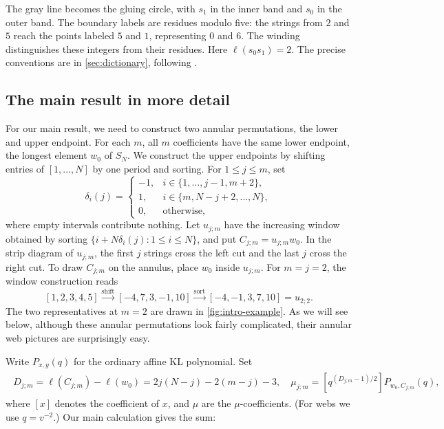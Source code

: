 \documentclass[a4paper,11pt]{amsart}
\numberwithin{equation}{subsection}
\theoremstyle{plain}
\theoremstyle{definition}
\theoremstyle{remark}
\begin{document}
The gray line becomes the gluing circle, with $s_1$ in the inner
band and $s_0$ in the outer band. The boundary labels are residues
modulo five: the strings from $2$ and $5$ reach the points labeled
$5$ and $1$, representing $0$ and $6$.
The winding distinguishes these integers from their residues.
Here $\ell(s_0s_1)=2$.
The precise conventions are in \autoref{sec:dictionary}, following
\cite[Section~2A]{HT}.

\subsection{The main result in more detail}

For our main result, we need to construct two annular permutations, the lower and upper endpoint.
For each $m$, all $m$ coefficients have the same lower endpoint, the longest element $w_0$ of $S_{N}$.
We construct the upper endpoints by shifting entries of
$[1,\ldots,N]$ by one period and sorting. For $1\le j\le m$, set
\[
\delta_i(j)=\begin{cases}
-1,&i\in\{1,\ldots,j-1,m+2\},\\
1,&i\in\{m,N-j+2,\ldots,N\},\\
0,&\text{otherwise},
\end{cases}
\]
where empty intervals contribute nothing. Let $u_{j;m}$ have the
increasing window obtained by sorting
$\{i+N\delta_i(j):1\le i\le N\}$, and put $C_{j;m}=u_{j;m}w_0$.
In the strip diagram of $u_{j;m}$, the first $j$ strings cross the
left cut and the last $j$ cross the right cut.
To draw $C_{j;m}$ on the annulus, place $w_0$ inside $u_{j;m}$.
For $m=j=2$, the window construction reads
\[
[1,2,3,4,5]
\xrightarrow{\text{shift}}[-4,7,3,-1,10]
\xrightarrow{\text{sort}}[-4,-1,3,7,10]=u_{2;2}.
\]
The two representatives at $m=2$ are drawn in
\autoref{fig:intro-example}. As we will see below, 
although these annular permutations look fairly complicated, their annular web pictures are surprisingly easy.

Write $P_{x,y}(q)$ for the ordinary affine KL polynomial. Set
\begin{gather*}
\begin{aligned}
D_{j;m}=\ell(C_{j;m})-\ell(w_0)
=2j(N-j)-2(m-j)-3,\quad
\mu_{j;m}=[q^{(D_{j;m}-1)/2}]P_{w_0,C_{j;m}}(q),
\end{aligned}
\end{gather*}
where $[x]$ denotes the coefficient of $x$, and $\mu$ are the $\mu$-coefficients.
(For webs we use $q=v^{-2}$.) Our main calculation gives the sum:
\end{document}
